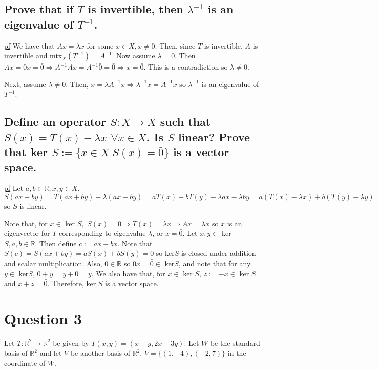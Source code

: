 \documentclass[11pt]{article} %
\begin{document}
\subsection{Prove that if $T$ is invertible, then $\lambda^{-1}$ is an eigenvalue of $T^{-1}$.}
\underline{pf} We have that $Ax = \lambda x$ for some $x \in X, x \neq \bar{0}$. Then, since $T$ is invertible, $A$ is invertible and mtx$_X(T^{-1}) = A^{-1}.$ Now assume $\lambda = 0$. Then $Ax = 0x = \bar{0} \Rightarrow A^{-1} A x = A^{-1} \bar{0} = \bar{0} \Rightarrow x = \bar{0}.$ This is a contradiction so $\lambda \neq 0$. 

Next, assume $\lambda \neq 0.$ Then, $x = \lambda A^{-1}x \Rightarrow \lambda^{-1} x = A^{-1}x$ so $\lambda^{-1}$ is an eigenvalue of $T^{-1}$.

\subsection{Define an operator $S: X \rightarrow X$ such that $S(x) = T(x) - \lambda x$ $\forall x \in X$. Is $S$ linear? Prove that ker $S:= \{ x \in X | S(x) = \bar{0}\}$ is a vector space.}
\underline{pf} Let $a,b \in \mathbb{R}, x,y \in X.$ $S(ax + by) = T(ax + by) - \lambda(ax+by) = aT(x) + bT(y) - \lambda a x - \lambda b y = a(T(x) - \lambda x) + b(T(y) - \lambda y) = aS(x) + bS(y)$ so $S$ is linear.

Note that, for $x \in $ ker $S,$ $S(x) = \bar{0} \Rightarrow T(x) = \lambda x \Rightarrow Ax = \lambda x$ so $x$ is an eigenvector for $T$ corresponding to eigenvalue $\lambda$, or $x = \bar{0}$. Let $x,y \in $ ker$S, a,b \in \mathbb{R}.$ Then define $c:= ax +bx.$ Note that $S(c) = S(ax+by) = aS(x)+bS(y) = \bar{0}$ so ker$S$ is closed under addition and scalar multiplication. Also, $0 \in \mathbb{R}$ so $0x = \bar{0} \in$ ker$S$, and note that for any $y \in $ ker$S$, $\bar{0} + y = y+\bar{0} = y.$  We also have that, for $x \in $ ker $S$, $z := -x \in $ ker $S$ and $x+z = \bar{0}.$ Therefore, ker $S$ is a vector space.


\section{Question 3}
Let $T: \mathbb{R}^2 \rightarrow \mathbb{R}^2$ be given by $T(x,y) = (x-y,2x+3y).$ Let $W$ be the standard basis of $\mathbb{R}^2$ and let $V$ be another basis of $\mathbb{R}^2$, $V = \{(1,-4),(-2,7) \}$ in the coordinate of $W$.
\end{document}
